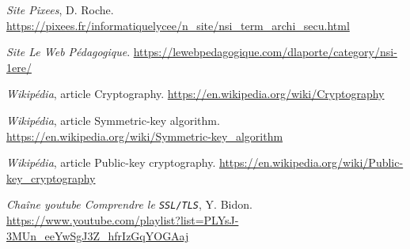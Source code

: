 \documentclass[a4paper,11pt]{article}
\begin{document}
\begin{thebibliography}{00}

  {\em Site Pixees}, D. Roche.
  \url{https://pixees.fr/informatiquelycee/n_site/nsi_term_archi_secu.html}




  {\em Site Le Web Pédagogique}.
  \url{https://lewebpedagogique.com/dlaporte/category/nsi-1ere/}

  {\em Wikipédia}, article \og Cryptography\fg.
  \url{https://en.wikipedia.org/wiki/Cryptography}

  {\em Wikipédia}, article \og Symmetric-key algorithm\fg.
  \url{https://en.wikipedia.org/wiki/Symmetric-key_algorithm}
  
  {\em Wikipédia}, article \og Public-key cryptography\fg.
  \url{https://en.wikipedia.org/wiki/Public-key_cryptography}
  
  {\em Chaîne youtube Comprendre le {\tt SSL/TLS}}, Y. Bidon.
  \url{https://www.youtube.com/playlist?list=PLYsJ-3MUn_eeYwSgJ3Z_hfrIzGqYOGAaj}

\end{thebibliography}

\end{document}
